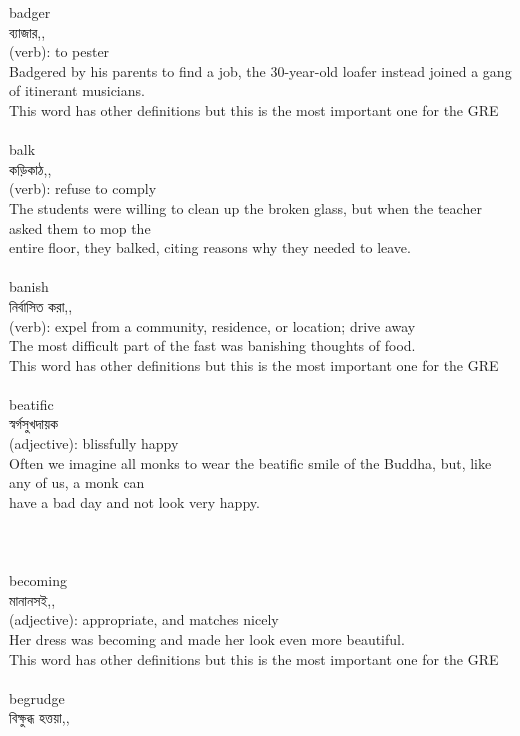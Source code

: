 \documentclass{article}
\begin{document}
{badger}\\
{ব্যাজার,,}\\
{(verb): to pester\\Badgered by his parents to find a job, the 30-year-old loafer instead joined a gang of itinerant musicians.\\This word has other definitions but this is the most important one for the GRE\\}\\
{balk}\\
{কড়িকাঠ,,}\\
{(verb): refuse to comply\\The students were willing to clean up the broken glass, but when the teacher asked them to mop the\\entire floor, they balked, citing reasons why they needed to leave.\\}\\
{banish}\\
{নির্বাসিত করা,,}\\
{(verb): expel from a community, residence, or location; drive away\\The most difficult part of the fast was banishing thoughts of food.\\This word has other definitions but this is the most important one for the GRE\\}\\
{beatific}\\
{স্বর্গসুখদায়ক}\\
{(adjective): blissfully happy\\Often we imagine all monks to wear the beatific smile of the Buddha, but, like any of us, a monk can\\have a bad day and not look very happy.\\\\                                                                               \\}\\
{becoming}\\
{মানানসই,,}\\
{(adjective): appropriate, and matches nicely\\Her dress was becoming and made her look even more beautiful.\\This word has other definitions but this is the most important one for the GRE\\}\\
{begrudge}\\
{বিক্ষুব্ধ হত্তয়া,,}\\
\end{document}
